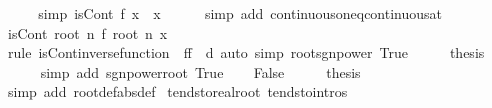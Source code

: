 \begin{isabellebody}
\ \ \isamarkupfalse%
\ \isamarkupfalse%
\ {\isacharbrackleft}{\kern0pt}simp{\isacharbrackright}{\kern0pt}{\isacharcolon}{\kern0pt}\ {\isachardoublequoteopen}isCont\ {\isacharquery}{\kern0pt}f\ x{\isachardoublequoteclose}\ \ x\isanewline
\ \ \ \ \isamarkupfalse%
\ {\isacharparenleft}{\kern0pt}simp\ add{\isacharcolon}{\kern0pt}\ continuous{\isacharunderscore}{\kern0pt}on{\isacharunderscore}{\kern0pt}eq{\isacharunderscore}{\kern0pt}continuous{\isacharunderscore}{\kern0pt}at{\isacharparenright}{\kern0pt}\isanewline
\ \ \isamarkupfalse%
\ {\isachardoublequoteopen}isCont\ {\isacharparenleft}{\kern0pt}root\ n{\isacharparenright}{\kern0pt}\ {\isacharparenleft}{\kern0pt}{\isacharquery}{\kern0pt}f\ {\isacharparenleft}{\kern0pt}root\ n\ x{\isacharparenright}{\kern0pt}{\isacharparenright}{\kern0pt}{\isachardoublequoteclose}\isanewline
\ \ \ \ \isamarkupfalse%
\ {\isacharparenleft}{\kern0pt}rule\ isCont{\isacharunderscore}{\kern0pt}inverse{\isacharunderscore}{\kern0pt}function\ {\isacharbrackleft}{\kern0pt}\ f{\isacharequal}{\kern0pt}{\isachardoublequoteopen}{\isacharquery}{\kern0pt}f{\isachardoublequoteclose}\ \ d{\isacharequal}{\kern0pt}{}{\isacharbrackright}{\kern0pt}{\isacharparenright}{\kern0pt}\ {\isacharparenleft}{\kern0pt}auto\ simp{\isacharcolon}{\kern0pt}\ root{\isacharunderscore}{\kern0pt}sgn{\isacharunderscore}{\kern0pt}power\ True{\isacharparenright}{\kern0pt}\isanewline
\ \ \isamarkupfalse%
\ \isamarkupfalse%
\ {\isacharquery}{\kern0pt}thesis\isanewline
\ \ \ \ \isamarkupfalse%
\ {\isacharparenleft}{\kern0pt}simp\ add{\isacharcolon}{\kern0pt}\ sgn{\isacharunderscore}{\kern0pt}power{\isacharunderscore}{\kern0pt}root\ True{\isacharparenright}{\kern0pt}\isanewline
{}\isamarkupfalse%
\isanewline
\ \ \isamarkupfalse%
\ False\isanewline
\ \ \isamarkupfalse%
\ \isamarkupfalse%
\ {\isacharquery}{\kern0pt}thesis\isanewline
\ \ \ \ \isamarkupfalse%
\ {\isacharparenleft}{\kern0pt}simp\ add{\isacharcolon}{\kern0pt}\ root{\isacharunderscore}{\kern0pt}def{\isacharbrackleft}{\kern0pt}abs{\isacharunderscore}{\kern0pt}def{\isacharbrackright}{\kern0pt}{\isacharparenright}{\kern0pt}\isanewline
{}\isamarkupfalse%
%
\endisatagproof
{\isafoldproof}%
%
\isadelimproof
\isanewline
%
\endisadelimproof
\isanewline
{}\isamarkupfalse%
\ tendsto{\isacharunderscore}{\kern0pt}real{\isacharunderscore}{\kern0pt}root\ {\isacharbrackleft}{\kern0pt}tendsto{\isacharunderscore}{\kern0pt}intros{\isacharbrackright}{\kern0pt}{\isacharcolon}{\kern0pt}\isanewline

\end{isabellebody}
